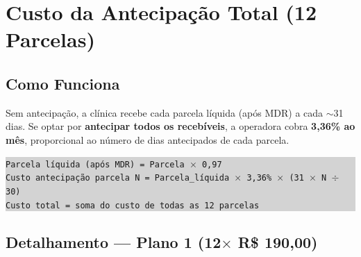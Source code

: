 \documentclass[12pt, a4paper]{article}
\begin{document}
\needspace{10cm}

\section{Custo da Antecipação Total (12 Parcelas)}

\subsection{Como Funciona}

Sem antecipação, a clínica recebe cada parcela líquida (após MDR) a cada $\sim$31 dias. Se optar por \textbf{antecipar todos os recebíveis}, a operadora cobra \textbf{3,36\% ao mês}, proporcional ao número de dias antecipados de cada parcela.

\begin{center}
\colorbox{lightGray}{%
    \parbox{0.85\textwidth}{%
        \vspace{0.3cm}
        \texttt{Parcela líquida (após MDR) = Parcela $\times$ 0,97} \\
        \vspace{0.1cm}
        \texttt{Custo antecipação parcela N = Parcela\_líquida $\times$ 3,36\% $\times$ (31 $\times$ N $\div$ 30)} \\
        \vspace{0.1cm}
        \texttt{Custo total = soma do custo de todas as 12 parcelas} \\
        \vspace{0.3cm}
    }%
}
\end{center}

\subsection{Detalhamento — Plano 1 (12$\times$ R\$ 190,00)}
\end{document}
